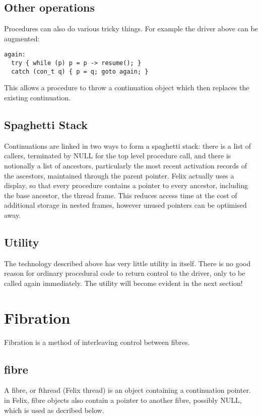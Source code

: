 \documentclass[oneside]{book}
\begin{document}
\subsection{Other operations}
Procedures can also do various tricky things. For example the driver above
can be augmented:

\begin{verbatim}
again:
  try { while (p) p = p -> resume(); }
  catch (con_t q) { p = q; goto again; }
\end{verbatim}

This allows a procedure to throw a continuation object which then replaces
the existing continuation.

\subsection{Spaghetti Stack}
Continuations are linked in two ways to form a spaghetti stack: there is a list
of callers, terminated by NULL for the top level procedure call, and there
is notionally a list of ancestors, particularly the most recent activation records
of the ascestors, maintained through the parent pointer. Felix actually uses a display,
so that every procedure contains a pointer to every ancestor, including the base
ancestor, the thread frame. This reduces access time at the cost of additional storage
in nested frames, however unused pointers can be optimised away.

\subsection{Utility}
The technology described above has very little utility in itself. There is
no good reason for ordinary procedural code to return control to the driver,
only to be called again immediately. The utility will become evident in
the next section!

\section{Fibration}
Fibration is a method of interleaving control between fibres.

\subsection{fibre}
A fibre, or fthread (Felix thread) is an object containing a continuation pointer.
in Felix, fibre objects also contain a pointer to another fibre, possibly NULL,
which is used as decribed below.
\end{document}
